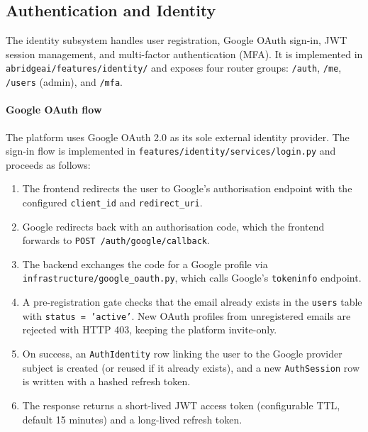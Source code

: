 \subsection{Authentication and Identity}
\label{sec:impl_auth}

The identity subsystem handles user registration, Google OAuth sign-in, JWT session management, and multi-factor authentication (MFA). It is implemented in \texttt{abridgeai/features/identity/} and exposes four router groups: \texttt{/auth}, \texttt{/me}, \texttt{/users} (admin), and \texttt{/mfa}.

\paragraph{Google OAuth flow}
The platform uses Google OAuth 2.0 as its sole external identity provider. The sign-in flow is implemented in \texttt{features/identity/services/login.py} and proceeds as follows:

\begin{enumerate}
    \item The frontend redirects the user to Google's authorisation endpoint with the configured \texttt{client\_id} and \texttt{redirect\_uri}.
    \item Google redirects back with an authorisation code, which the frontend forwards to \texttt{POST /auth/google/callback}.
    \item The backend exchanges the code for a Google profile via \texttt{infrastructure/google\_oauth.py}, which calls Google's \texttt{tokeninfo} endpoint.
    \item A pre-registration gate checks that the email already exists in the \texttt{users} table with \texttt{status = 'active'}. New OAuth profiles from unregistered emails are rejected with HTTP 403, keeping the platform invite-only.
    \item On success, an \texttt{AuthIdentity} row linking the user to the Google provider subject is created (or reused if it already exists), and a new \texttt{AuthSession} row is written with a hashed refresh token.
    \item The response returns a short-lived JWT access token (configurable TTL, default 15 minutes) and a long-lived refresh token.
\end{enumerate}


